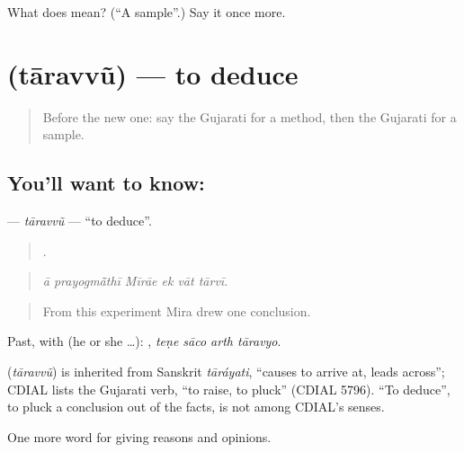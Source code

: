 \begin{tcolorbox}[breakable,colback=teal!4,colframe=teal!35!black,title={Before you move on}]
What does  mean? (\textquotedblleft{}A sample\textquotedblright{}.) Say it once more.
\end{tcolorbox}
\section[\texorpdfstring{\gu{તારવવું} (tāravvũ)}{તારવવું (tāravvũ)}]{ (tāravvũ) — to deduce}

\label{lesson:GU-C362-taravvu}



\begin{quote}
Before the new one: say the Gujarati for a method, then the Gujarati for a sample.
\end{quote}

\subsection*{You'll want to know: }
\textbf{} — \emph{tāravvũ} — \textquotedblleft{}to deduce\textquotedblright{}.

\begin{quote}
     .
\end{quote}

\begin{quote}
\emph{ā prayogmā̃thī Mīrāe ek vāt tārvī.}
\end{quote}

\begin{quote}
From this experiment Mira drew one conclusion.
\end{quote}

Past, with  (he or she …):    , \emph{teṇe sāco arth tāravyo}.

\begin{cousinweb}
\textbf{} (\emph{tāravvũ}) is inherited from Sanskrit \emph{tāráyati}, \textquotedblleft{}causes to arrive at, leads across\textquotedblright{}; CDIAL lists the Gujarati verb, \textquotedblleft{}to raise, to pluck\textquotedblright{} (CDIAL 5796). \textquotedblleft{}To deduce\textquotedblright{}, to pluck a conclusion out of the facts, is not among CDIAL's senses.
\end{cousinweb}

\begin{grammarlens}[title={What you've built}]
One more word for giving reasons and opinions.
\end{grammarlens}

